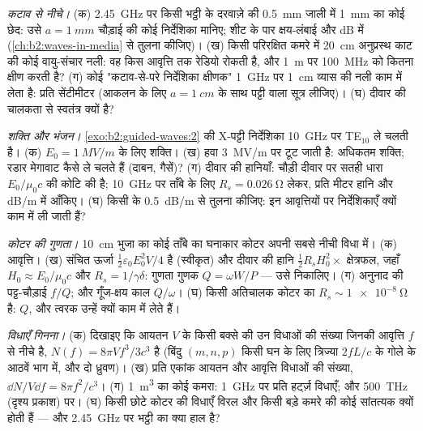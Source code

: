 \begin{exercise}[$\star\star$]\label{exo:b2:guided-waves:6}
\emph{कटाव से नीचे।} (क) \qty{2.45}{GHz} पर किसी भट्ठी के दरवाज़े की \qty{0.5}{mm} जाली
में \qty{1}{mm} का कोई छेद: उसे $a = \qty{1}{mm}$ चौड़ाई की कोई निर्देशिका मानिए;
शीट के पार क्षय-लंबाई और dB में 
(\cref{ch:b2:waves-in-media} से तुलना कीजिए)। (ख) किसी परिरक्षित कमरे में
\qty{20}{cm} अनुप्रस्थ काट की कोई वायु-संचार नली: वह किस आवृत्ति तक रेडियो
रोकती है, और \qty{1}{m} पर \qty{100}{MHz} को कितना क्षीण करती है? (ग) कोई
"कटाव-से-परे निर्देशिका क्षीणक" \qty{1}{GHz} पर \qty{1}{cm} व्यास की नली काम में लेता है:
प्रति सेंटीमीटर  (आकलन के लिए $a =
\qty{1}{cm}$ के साथ पट्टी वाला सूत्र लीजिए)। (घ)  दीवार की चालकता से
स्वतंत्र क्यों है?
\end{exercise}

\begin{exercise}[$\star\star$]\label{exo:b2:guided-waves:7}
\emph{शक्ति और भंजन।} \cref{exo:b2:guided-waves:2} की X-पट्टी निर्देशिका
\qty{10}{GHz} पर TE$_{10}$ ले चलती है। (क) $E_0 = \qty{1}{MV/m}$ के लिए शक्ति। (ख) हवा
\qty{3}{MV/m} पर टूट जाती है: अधिकतम शक्ति; रडार मेगावाट कैसे ले चलते
हैं (दाबन, गैसें)? (ग) दीवार की हानियाँ: चौड़ी दीवार पर सतही धारा
$E_0/\mu_0c$ की कोटि की है; \qty{10}{GHz} पर ताँबे के लिए $R_s = \qty{0.026}{\ohm}$
लेकर, प्रति मीटर हानि और dB/m में  आँकिए। (घ) किसी 
के \qty{0.5}{dB/m} से तुलना कीजिए: इन आवृत्तियों पर निर्देशिकाएँ क्यों काम में ली जाती हैं?
\end{exercise}

\begin{exercise}[$\star\star$]\label{exo:b2:guided-waves:8}
\emph{कोटर की गुणता।} \qty{10}{cm} भुजा का कोई ताँबे का घनाकार कोटर अपनी
सबसे नीची विधा में। (क) आवृत्ति। (ख) संचित ऊर्जा $\tfrac12\varepsilon_0E_0^2V/4$
है (स्वीकृत) और दीवार की हानि $\tfrac12R_sH_0^2\times$ क्षेत्रफल, जहाँ $H_0 \approx E_0/
\mu_0c$ और $R_s = 1/\gamma\delta$: गुणता गुणक $Q = \omega W/P$ --- उसे निकालिए।
(ग) अनुनाद की पट्ट-चौड़ाई $f/Q$; और गूँज-क्षय काल $Q/\omega$। (घ) किसी
अतिचालक कोटर का $R_s \sim \qty{1e-8}{\ohm}$ है: $Q$, और त्वरक उन्हें
क्यों काम में लेते हैं।
\end{exercise}

\begin{exercise}[$\star\star$]\label{exo:b2:guided-waves:9}
\emph{विधाएँ गिनना।} (क) दिखाइए कि आयतन $V$ के किसी बक्से की उन
विधाओं की संख्या जिनकी आवृत्ति $f$ से नीचे है, $N(f) = 8\pi Vf^3/3c^3$ है (बिंदु
$(m, n, p)$ किसी घन के लिए त्रिज्या $2fL/c$ के गोले के आठवें भाग में, और दो
ध्रुवण)। (ख) प्रति एकांक आयतन और आवृत्ति विधाओं की संख्या,
$\dd N/V\dd f = 8\pi f^2/c^3$। (ग) \qty{1}{m^3} का कोई कमरा: \qty{1}{GHz} पर प्रति हर्ट्ज़
विधाएँ; और \qty{500}{THz} (दृश्य प्रकाश) पर। (घ) किसी छोटे कोटर की विधाएँ
विरल और किसी बड़े कमरे की कोई सांतत्यक क्यों होती हैं --- और \qty{2.45}{GHz} पर
भट्ठी का क्या हाल है?
\end{exercise}

